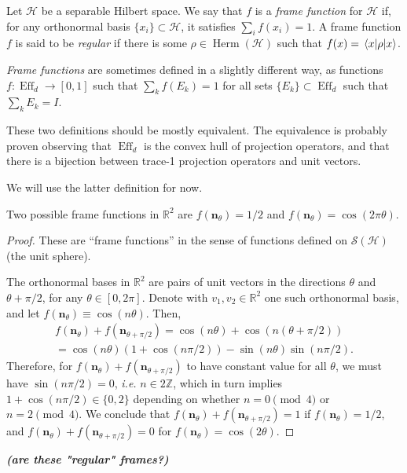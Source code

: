 \documentclass[12pt]{report}
\newcommand{\ZZ}{\mathbb{Z}}
\newcommand{\RR}{\mathbb{R}}
\newcommand{\on}[1]{\operatorname{#1}}
\newcommand{\bs}[1]{\boldsymbol{#1}}
\newcommand{\calH}{{\mathcal{H}}}
\newcommand{\calS}{{\mathcal{S}}}
\newcommand{\wondering}[1]{{\color{red}\itshape\bfseries (#1)}}
\DeclareMathOperator{\Herm}{Herm}
\begin{document}
\begin{defn}
	Let $\calH$ be a separable Hilbert space.
	We say that $f$ is a \emph{frame function} for $\calH$ if, for any orthonormal basis $\{x_i\}\subset\calH$, it satisfies
	$\sum_i f(x_i) = 1$.
	A frame function $f$ is said to be \emph{regular} if there is some $\rho\in\Herm(\calH)$ such that $f(x)=\mel{x}{\rho}{x}$.
\end{defn}

\begin{defn}
	\emph{Frame functions} are sometimes defined in a slightly different way, as functions $f:\on{Eff}_d\to[0,1]$ such that $\sum_k f(E_k)=1$ for all sets $\{E_k\}\subset\on{Eff}_d$ such that $\sum_k E_k=I$.
\end{defn}
These two definitions should be mostly equivalent. The equivalence is probably proven observing that $\on{Eff}_d$ is the convex hull of projection operators, and that there is a bijection between trace-1 projection operators and unit vectors.

We will use the latter definition for now.

\begin{example}
	Two possible frame functions in $\RR^2$ are $f(\bs n_\theta)=1/2$ and $f(\bs n_\theta)=\cos(2\pi \theta)$.
\end{example}
\begin{proof}
	These are ``frame functions'' in the sense of functions defined on $\calS(\calH)$ (the unit sphere).

	The orthonormal bases in $\RR^2$ are pairs of unit vectors in the directions $\theta$ and $\theta+\pi/2$, for any $\theta\in[0,2\pi]$.
	Denote with $v_1, v_2\in\RR^2$ one such orthonormal basis, and let $f(\bs n_\theta)\equiv \cos(n\theta)$. Then,
	\begin{equation}
	\begin{gathered}
		f(\bs n_\theta) + f(\bs n_{\theta+\pi/2})
		= \cos(n \theta) + \cos(n(\theta+\pi/2)) \\
		= \cos(n\theta)(1 + \cos(n\pi/2)) - \sin(n\theta) \sin(n\pi/2).
	\end{gathered}
	\end{equation}
	Therefore, for $f(\bs n_\theta) + f(\bs n_{\theta+\pi/2})$ to have constant value for all $\theta$, we must have $\sin(n\pi/2)=0$, \emph{i.e.} $n\in 2\ZZ$, which in turn implies $1+\cos(n\pi/2)\in\{0,2\}$ depending on whether $n=0\pmod 4$ or ${n=2\pmod 4}$.
	We conclude that $f(\bs n_\theta) + f(\bs n_{\theta+\pi/2})=1$ if $f(\bs n_\theta)=1/2$, and
	$f(\bs n_\theta) + f(\bs n_{\theta+\pi/2})=0$ for $f(\bs n_\theta)=\cos(2\theta)$.
\end{proof}
\wondering{are these "regular" frames?}
\end{document}
